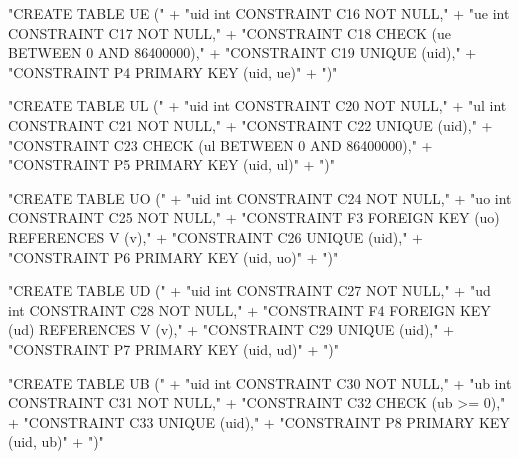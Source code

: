 \documentclass{article}
\def\nwendcode{\endtrivlist \endgroup}
\let\nwdocspar=\par
\theoremstyle{definition}
\begin{document}
\nwenddocs{}\endmoddef{}
"CREATE TABLE UE ("
  + "uid int  CONSTRAINT C16 NOT NULL,"
  + "ue  int  CONSTRAINT C17 NOT NULL,"
  + "CONSTRAINT C18 CHECK (ue BETWEEN 0 AND 86400000),"
  + "CONSTRAINT C19 UNIQUE (uid),"
  + "CONSTRAINT P4 PRIMARY KEY (uid, ue)"
  + ")"
\nwendcode{}\nwdocspar
\nwenddocs{}\endmoddef{}
"CREATE TABLE UL ("
  + "uid int  CONSTRAINT C20 NOT NULL,"
  + "ul  int  CONSTRAINT C21 NOT NULL,"
  + "CONSTRAINT C22 UNIQUE (uid),"
  + "CONSTRAINT C23 CHECK (ul BETWEEN 0 AND 86400000),"
  + "CONSTRAINT P5 PRIMARY KEY (uid, ul)"
  + ")"
\nwendcode{}\nwdocspar
\nwenddocs{}\endmoddef{}
"CREATE TABLE UO ("
  + "uid int  CONSTRAINT C24 NOT NULL,"
  + "uo  int  CONSTRAINT C25 NOT NULL,"
  + "CONSTRAINT F3 FOREIGN KEY (uo) REFERENCES V (v),"
  + "CONSTRAINT C26 UNIQUE (uid),"
  + "CONSTRAINT P6 PRIMARY KEY (uid, uo)"
  + ")"
\nwendcode{}\nwdocspar
\nwenddocs{}\endmoddef{}
"CREATE TABLE UD ("
  + "uid int  CONSTRAINT C27 NOT NULL,"
  + "ud  int  CONSTRAINT C28 NOT NULL,"
  + "CONSTRAINT F4 FOREIGN KEY (ud) REFERENCES V (v),"
  + "CONSTRAINT C29 UNIQUE (uid),"
  + "CONSTRAINT P7 PRIMARY KEY (uid, ud)"
  + ")"
\nwendcode{}\nwdocspar
\nwenddocs{}\endmoddef{}
"CREATE TABLE UB ("
  + "uid int  CONSTRAINT C30 NOT NULL,"
  + "ub  int  CONSTRAINT C31 NOT NULL,"
  + "CONSTRAINT C32 CHECK (ub >= 0),"
  + "CONSTRAINT C33 UNIQUE (uid),"
  + "CONSTRAINT P8 PRIMARY KEY (uid, ub)"
  + ")"
\nwendcode{}\nwdocspar
\end{document}
